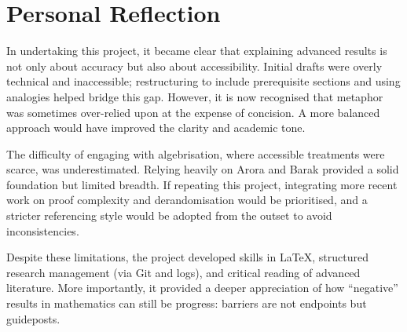 \documentclass[12pt]{report}
\begin{document}
\section{Personal Reflection}
In undertaking this project, it became clear that explaining advanced results is not only about accuracy but also about accessibility. Initial drafts were overly technical and inaccessible; restructuring to include prerequisite sections and using analogies helped bridge this gap. However, it is now recognised that metaphor was sometimes over-relied upon at the expense of concision. A more balanced approach would have improved the clarity and academic tone.  

The difficulty of engaging with algebrisation, where accessible treatments were scarce, was underestimated. Relying heavily on Arora and Barak provided a solid foundation but limited breadth. If repeating this project, integrating more recent work on proof complexity and derandomisation would be prioritised, and a stricter referencing style would be adopted from the outset to avoid inconsistencies.  

Despite these limitations, the project developed skills in \LaTeX, structured research management (via Git and logs), and critical reading of advanced literature. More importantly, it provided a deeper appreciation of how ``negative'' results in mathematics can still be progress: barriers are not endpoints but guideposts.  
\end{document}
